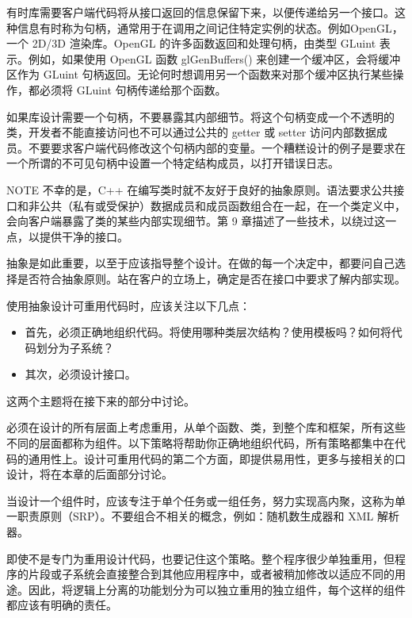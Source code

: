 有时库需要客户端代码将从接口返回的信息保留下来，以便传递给另一个接口。这种信息有时称为句柄，通常用于在调用之间记住特定实例的状态。例如OpenGL，一个 2D/3D 渲染库。OpenGL 的许多函数返回和处理句柄，由类型 GLuint 表示。例如，如果使用 OpenGL 函数 glGenBuffers() 来创建一个缓冲区，会将缓冲区作为 GLuint 句柄返回。无论何时想调用另一个函数来对那个缓冲区执行某些操作，都必须将 GLuint 句柄传递给那个函数。

如果库设计需要一个句柄，不要暴露其内部细节。将这个句柄变成一个不透明的类，开发者不能直接访问也不可以通过公共的 getter 或 setter 访问内部数据成员。不要要求客户端代码修改这个句柄内部的变量。一个糟糕设计的例子是要求在一个所谓的不可见句柄中设置一个特定结构成员，以打开错误日志。

\begin{myNotic}{NOTE}
不幸的是，C++ 在编写类时就不友好于良好的抽象原则。语法要求公共接口和非公共（私有或受保护）数据成员和成员函数组合在一起，在一个类定义中，会向客户端暴露了类的某些内部实现细节。第 9 章描述了一些技术，以绕过这一点，以提供干净的接口。
\end{myNotic}

抽象是如此重要，以至于应该指导整个设计。在做的每一个决定中，都要问自己选择是否符合抽象原则。站在客户的立场上，确定是否在接口中要求了解内部实现。

使用抽象设计可重用代码时，应该关注以下几点：

\begin{itemize}
\item
首先，必须正确地组织代码。将使用哪种类层次结构？使用模板吗？如何将代码划分为子系统？

\item
其次，必须设计接口。
\end{itemize}

这两个主题将在接下来的部分中讨论。


必须在设计的所有层面上考虑重用，从单个函数、类，到整个库和框架，所有这些不同的层面都称为组件。以下策略将帮助你正确地组织代码，所有策略都集中在代码的通用性上。设计可重用代码的第二个方面，即提供易用性，更多与接相关的口设计，将在本章的后面部分讨论。


当设计一个组件时，应该专注于单个任务或一组任务，努力实现高内聚，这称为单一职责原则（SRP）。不要组合不相关的概念，例如：随机数生成器和 XML 解析器。

即使不是专门为重用设计代码，也要记住这个策略。整个程序很少单独重用，但程序的片段或子系统会直接整合到其他应用程序中，或者被稍加修改以适应不同的用途。因此，将逻辑上分离的功能划分为可以独立重用的独立组件，每个这样的组件都应该有明确的责任。


